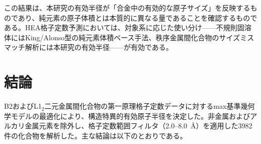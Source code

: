 \documentclass[a4paper,10pt,5p]{elsarticle}
\begin{document}
この結果は、本研究の有効半径が「合金中の有効的な原子サイズ」を反映するものであり、純元素の原子体積とは本質的に異なる量であることを確認するものである。HEA格子定数予測においては、対象系に応じた使い分け——不規則固溶体にはKing/Alonso型の純元素体積ベース手法、秩序金属間化合物のサイズミスマッチ解析には本研究の有効半径——が有効である。


\section{結論}
B2およびL1$_2$二元金属間化合物の第一原理格子定数データに対するmax基準幾何学モデルの最適化により、構造特異的有効原子半径を決定した。非金属およびアルカリ金属元素を除外し、格子定数範囲フィルタ（2.0--8.0~\AA）を適用した3982件の化合物を解析した。主な結論は以下のとおりである。
\end{document}

